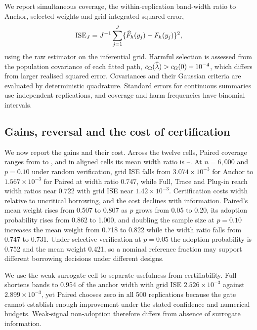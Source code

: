 We report simultaneous coverage, the within-replication band-width ratio to Anchor, selected weights and grid-integrated squared error,
\[
 \operatorname{ISE}_{J}=J^{-1}\sum_{j=1}^J
       \{\widehat F_h(y_j)-F_h(y_j)\}^2,
\]
using the raw estimator on the inferential grid. Harmful selection is assessed from the population covariance of each fitted path, $c_\Omega(\widehat\lambda)>c_\Omega(0)+10^{-4}$, which differs from larger realised squared error. Covariances and their Gaussian criteria are evaluated by deterministic quadrature. Standard errors for continuous summaries use independent replications, and coverage and harm frequencies have binomial intervals.

\subsection{Gains, reversal and the cost of certification}
We now report the gains and their cost. Across the twelve cells, Paired coverage ranges from \SimCovMin{} to \SimCovMax{}, and in aligned cells its mean width ratio is \SimAlignedWidthMin{}--\SimAlignedWidthMax{}. At $n=6,000$ and $p=0.10$ under random verification, grid ISE falls from $3.074\times10^{-3}$ for Anchor to $1.567\times10^{-3}$ for Paired at width ratio 0.747, while Full, Trace and Plug-in reach width ratios near 0.722 with grid ISE near $1.42\times10^{-3}$. Certification costs width relative to uncritical borrowing, and the cost declines with information. Paired's mean weight rises from 0.507 to 0.807 as $p$ grows from 0.05 to 0.20, its adoption probability rises from 0.862 to 1.000, and doubling the sample size at $p=0.10$ increases the mean weight from 0.718 to 0.822 while the width ratio falls from 0.747 to 0.731. Under selective verification at $p=0.05$ the adoption probability is 0.752 and the mean weight 0.421, so a nominal reference fraction may support different borrowing decisions under different designs.

We use the weak-surrogate cell to separate usefulness from certifiability. Full shortens bands to 0.954 of the anchor width with grid ISE $2.526\times10^{-3}$ against $2.899\times10^{-3}$, yet Paired chooses zero in all 500 replications because the gate cannot establish enough improvement under the stated confidence and numerical budgets. Weak-signal non-adoption therefore differs from absence of surrogate information.


